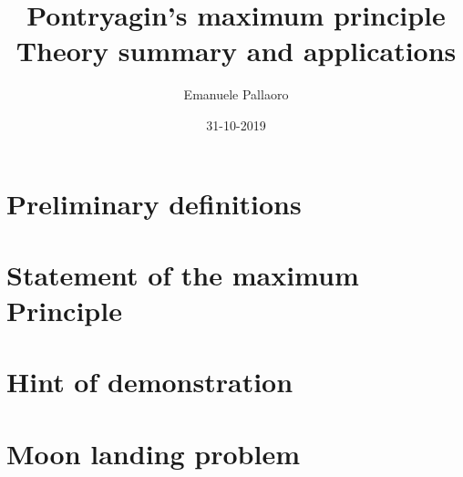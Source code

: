 \documentclass[14pt, margin=2pt]{article}
\title{%
	Pontryagin's maximum principle\\
	\large Theory summary and applications
}
\author{Emanuele Pallaoro}
\date{31-10-2019}
\numberwithin{equation}{section}
\begin{document}
\maketitle
\pagestyle{plain}

\section{Preliminary definitions}

\section{Statement of the maximum Principle}

\section{Hint of demonstration}


\clearpage
\section{Moon landing problem}
\end{document}

